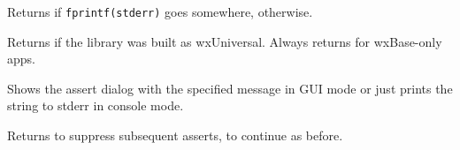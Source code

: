 \label{wxapptraitshasstderr}


Returns \true if {\tt fprintf(stderr)} goes somewhere, \false otherwise.


\label{wxapptraitsisusinguniversalwidgets}


Returns \true if the library was built as wxUniversal. Always returns
\false for wxBase-only apps.


\label{wxapptraitsshowassertdialog}


Shows the assert dialog with the specified message in GUI mode or just prints
the string to stderr in console mode.

Returns \true to suppress subsequent asserts, \false to continue as before.

